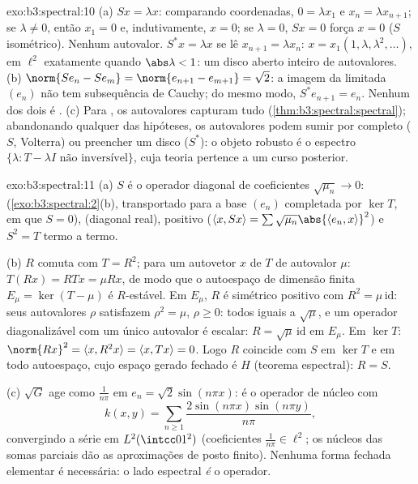 \begin{solution}{exo:b3:spectral:10}
(a) $Sx = \lambda x$: comparando coordenadas, $0 = \lambda
x_1$ e $x_n = \lambda x_{n+1}$; se $\lambda \ne 0$, então
$x_1 = 0$ e, indutivamente, $x = 0$; se $\lambda = 0$, $Sx = 0$
força $x = 0$ ($S$ isométrico). Nenhum autovalor. $S^*x =
\lambda x$ se lê $x_{n+1} = \lambda x_n$: $x =
x_1(1, \lambda, \lambda^2, \dots)$, em $\ell^2$ exatamente quando
$\abs\lambda < 1$: um disco aberto inteiro de autovalores.
(b) $\norm{Se_n - Se_m} = \norm{e_{n+1} - e_{m+1}} = \sqrt2$:
a imagem da limitada $(e_n)$ não tem subsequência de Cauchy;
do mesmo modo, $S^*e_{n+1} = e_n$. Nenhum dos dois é .
(c) Para  , os autovalores
capturam tudo (\cref{thm:b3:spectral:spectral}); abandonando
qualquer das hipóteses, os autovalores podem sumir por completo ($S$,
Volterra) ou preencher um disco ($S^*$): o objeto robusto é o
espectro $\{\lambda : T - \lambda I \text{ não inversível}\}$,
cuja teoria pertence a um curso posterior.
\end{solution}

\begin{solution}{exo:b3:spectral:11}
(a) $S$ é o operador diagonal de coeficientes
$\sqrt{\mu_n} \to 0$: 
(\cref{exo:b3:spectral:2}(b), transportado para a base
$(e_n)$ completada por $\ker T$, em que $S = 0$), 
(diagonal real), positivo ($\langle x, Sx\rangle =
\sum\sqrt{\mu_n}\abs{\langle e_n, x\rangle}^2$) e $S^2 =
T$ termo a termo.

(b) $R$ comuta com $T = R^2$; para um autovetor $x$ de
$T$ de autovalor $\mu$: $T(Rx) = RTx = \mu Rx$, de modo que o
autoespaço de dimensão finita $E_\mu = \ker(T - \mu)$ é
$R$-estável. Em $E_\mu$, $R$ é simétrico positivo com $R^2
= \mu\,\mathrm{id}$: seus autovalores $\rho$ satisfazem $\rho^2
= \mu$, $\rho \geq 0$: todos iguais a $\sqrt\mu$, e um
operador diagonalizável com um único autovalor é escalar:
$R = \sqrt\mu\,\mathrm{id}$ em $E_\mu$. Em $\ker T$: $\norm
{Rx}^2 = \langle x, R^2x\rangle = \langle x, Tx\rangle = 0$.
Logo $R$ coincide com $S$ em $\ker T$ e em todo autoespaço,
cujo espaço gerado fechado é $H$ (teorema espectral): $R = S$.

(c) $\sqrt G$ age como $\frac1{n\pi}$ em $e_n =
\sqrt2\sin(n\pi x)$: é o operador de núcleo com
\[
k(x, y) = \sum_{n\geq1}\frac{2\sin(n\pi x)\sin(n\pi
y)}{n\pi},
\]
convergindo a série em $L^2(\intcc01^2)$ (coeficientes
$\frac1{n\pi} \in \ell^2$; os núcleos das somas parciais dão as
aproximações de posto finito). Nenhuma forma fechada elementar é
necessária: o lado espectral \emph{é} o operador.
\end{solution}

